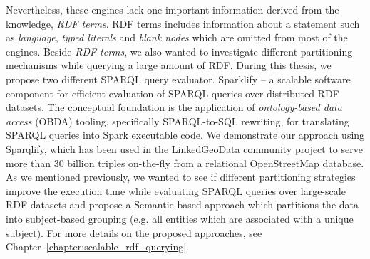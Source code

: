 Nevertheless, these engines lack one important information derived from the knowledge, \emph{RDF terms}.
RDF terms includes information about a statement such as \emph{language}, \emph{typed literals} and \emph{blank nodes} which are omitted from most of the engines.
Beside \emph{RDF terms}, we also wanted to investigate different partitioning mechanisms while querying a large amount of \gls{RDF}.
During this thesis, we propose two different \gls{SPARQL} query evaluator.
Sparklify -- a scalable software component for efficient evaluation of SPARQL queries over distributed RDF datasets. 
The conceptual foundation is the application of \emph{ontology-based data access} (OBDA) tooling, specifically SPARQL-to-SQL rewriting, for translating SPARQL queries into Spark executable code. 
We demonstrate our approach using Sparqlify, which has been used in the LinkedGeoData community project to serve more than 30 billion triples on-the-fly from a relational OpenStreetMap database.
As we mentioned previously, we wanted to see if different partitioning strategies improve the execution time while evaluating \gls{SPARQL} queries over large-scale \gls{RDF} datasets and propose a Semantic-based approach which partitions the data into subject-based grouping (e.g. all entities which are associated with a unique subject).
For more details on the proposed approaches, see Chapter~\ref{chapter:scalable_rdf_querying}.



